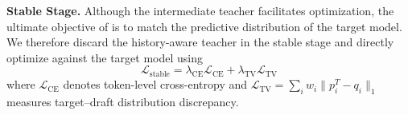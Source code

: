 

\textbf{Stable Stage.} Although the intermediate teacher facilitates optimization, the ultimate objective of \we is to match the predictive distribution of the target model. We therefore discard the history-aware teacher 
in the stable stage and directly optimize \we against the target model using
\begin{equation}
\mathcal L_{\mathrm{stable}} = \lambda_{\mathrm{CE}}\mathcal L_{\mathrm{CE}} + \lambda_{\mathrm{TV}}\mathcal L_{\mathrm{TV}}
\end{equation}
where \(\mathcal L_{\mathrm{CE}}\) denotes token-level cross-entropy and
\(\mathcal L_{\mathrm{TV}}=\sum_i w_i \|p_i^T-q_i\|_1\) measures target–draft distribution discrepancy. 









